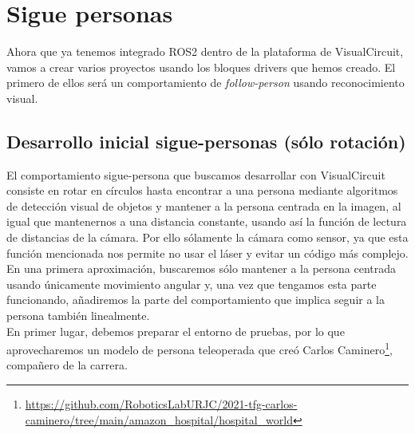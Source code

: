 \chapter{Sigue personas}
\label{cap:capitulo5}
Ahora que ya tenemos integrado ROS2 dentro de la plataforma de VisualCircuit, vamos a crear varios proyectos usando los bloques drivers que hemos creado.
El primero de ellos será un comportamiento de \textit{follow-person} usando reconocimiento visual.

\section{Desarrollo inicial sigue-personas (sólo rotación)}
\label{sec:FP_intro}

El comportamiento sigue-persona que buscamos desarrollar con VisualCircuit consiste en rotar en círculos hasta encontrar a una persona mediante
algoritmos de detección visual de objetos y mantener a la persona centrada en la imagen, al igual que mantenernos a una distancia constante,
usando así la función de lectura de distancias de la cámara. Por ello sólamente la cámara como sensor, ya que esta función mencionada nos permite no
usar el láser y evitar un código más complejo.\\

En una primera aproximación, buscaremos sólo mantener a la persona centrada usando únicamente movimiento angular y, una vez que tengamos esta parte funcionando,
añadiremos la parte del comportamiento que implica seguir a la persona también linealmente.\\

En primer lugar, debemos preparar el entorno de pruebas, por lo que aprovecharemos un modelo de persona teleoperada que creó Carlos
Caminero\footnote{\url{https://github.com/RoboticsLabURJC/2021-tfg-carlos-caminero/tree/main/amazon_hospital/hospital_world}}, compañero de la carrera.

